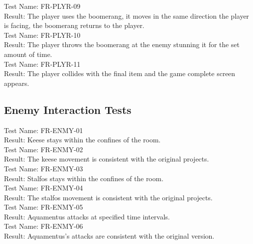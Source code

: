 \documentclass[12pt, titlepage]{article}
\begin{document}
Test Name: FR-PLYR-09\\

Result: The player uses the boomerang, it moves in the same direction the player is facing, the boomerang returns to the player.\\

Test Name: FR-PLYR-10\\

Result: The player throws the boomerang at the enemy stunning it for the set amount of time.\\

Test Name: FR-PLYR-11\\

Result: The player collides with the final item and the game complete screen appears.\\

\subsection{Enemy Interaction Tests}

Test Name: FR-ENMY-01\\

Result: Keese stays within the confines of the room.\\

Test Name: FR-ENMY-02\\

Result: The keese movement is consistent with the original projects.\\

Test Name: FR-ENMY-03\\

Result: Stalfos stays within the confines of the room.\\

Test Name: FR-ENMY-04\\

Result: The stalfos movement is consistent with the original projects.\\

Test Name: FR-ENMY-05\\

Result: Aquamentus attacks at specified time intervals.\\

Test Name: FR-ENMY-06\\

Result: Aquamentus's attacks are consistent with the original version.\\
\end{document}
